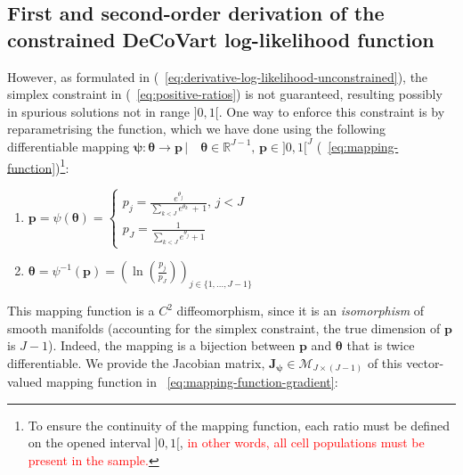 \documentclass[long, final]{jobim}
\newcommand \RR {\mathbb{R}}
\begin{document}
\subsection{First and second-order derivation of the constrained DeCoVart log-likelihood function}
\label{subsubsec:contrained-optimisation}


However, as formulated in (\equationname~\ref{eq:derivative-log-likelihood-unconstrained}), the simplex constraint in (\equationname~\ref{eq:positive-ratios}) is not guaranteed, resulting possibly in spurious solutions not in range $]0, 1[$. One way to enforce this constraint is by reparametrising the function, which we have done using the following differentiable mapping $\boldsymbol{\psi}:\boldsymbol{\theta}  \to  \boldsymbol{p} \, | \quad  \boldsymbol{\theta} \in \RR^{J-1} , \, \boldsymbol{p} \in ]0, 1[^{J}$ (\equationname~\ref{eq:mapping-function})\footnote{To ensure the continuity of the mapping function, each ratio must be defined on the opened interval $]0, 1[$, \textcolor{red}{in other words, all cell populations must be present in the sample.}}:

\begin{multicols}{2}
\label{eq:mapping-function}
\begin{enumerate}[label=\emph{\alph*})]
\item $\boldsymbol{p} = \psi (\boldsymbol{\theta}) =
\begin{cases}
p_j =  \frac{e^{\theta_j}}{\sum_{k < J} e^{\theta_k} \, + \, 1}, \, j < J\\
p_J =  \frac{1}{\sum_{k < J} e^{\theta_j} + 1}
\end{cases}$
\item $\boldsymbol{\theta} = \psi^{-1} (\boldsymbol{p}) = \left(\ln{\left( \frac{p_j}{p_J}\right)} \right)_{j \in \{ 1, \ldots, J -1\}}$
\end{enumerate}
\end{multicols}


This mapping function is a $C^2$ diffeomorphism, since it is an \textit{isomorphism} of smooth manifolds (accounting for the simplex constraint, the true dimension of $\boldsymbol{p}$ is $J-1$). Indeed, the mapping is a bijection between $\boldsymbol{p}$ and $\boldsymbol{\theta}$ that is twice differentiable. We provide the Jacobian matrix, $\mathbf{J}_{\boldsymbol{\psi}} \in \mathcal{M}_{J \times (J-1)}$ of this vector-valued mapping function in \equationname~\ref{eq:mapping-function-gradient}: 
\end{document}
